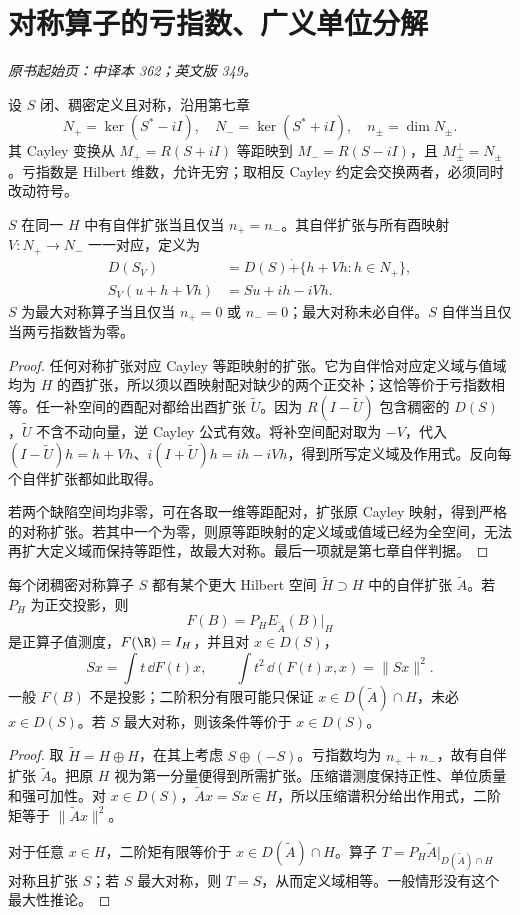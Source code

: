 \section{对称算子的亏指数、广义单位分解}\label{sec:yosida-11-15}
\noindent\textit{原书起始页：中译本 362；英文版 349。}

设 $S$ 闭、稠密定义且对称，沿用第七章
\[
 N_+=\ker(S^*-iI),\quad N_-=\ker(S^*+iI),\quad
 n_\pm=\dim N_\pm.
\]
其 Cayley 变换从 $M_+=R(S+iI)$ 等距映到 $M_-=R(S-iI)$，且 $M_\pm^\perp=N_\pm$。亏指数是 Hilbert 维数，允许无穷；取相反 Cayley 约定会交换两者，必须同时改动符号。

\begin{theorem}[自伴扩张与最大对称性]\label{thm:y11-extensions}
$S$ 在同一 $H$ 中有自伴扩张当且仅当 $n_+=n_-$。其自伴扩张与所有酉映射 $V:N_+\to N_-$ 一一对应，定义为
\begin{align*}
 D(S_V)&=D(S)\mathbin{\dot+}\{h+Vh:h\in N_+\},\\
 S_V(u+h+Vh)&=Su+ih-iVh.
\end{align*}
$S$ 为最大对称算子当且仅当 $n_+=0$ 或 $n_-=0$；最大对称未必自伴。$S$ 自伴当且仅当两亏指数皆为零。
\end{theorem}
\begin{proof}
任何对称扩张对应 Cayley 等距映射的扩张。它为自伴恰对应定义域与值域均为 $H$ 的酉扩张，所以须以酉映射配对缺少的两个正交补；这恰等价于亏指数相等。任一补空间的酉配对都给出酉扩张 $\widetilde U$。因为 $R(I-\widetilde U)$ 包含稠密的 $D(S)$，$\widetilde U$ 不含不动向量，逆 Cayley 公式有效。将补空间配对取为 $-V$，代入 $(I-\widetilde U)h=h+Vh$、$i(I+\widetilde U)h=ih-iVh$，得到所写定义域及作用式。反向每个自伴扩张都如此取得。

若两个缺陷空间均非零，可在各取一维等距配对，扩张原 Cayley 映射，得到严格的对称扩张。若其中一个为零，则原等距映射的定义域或值域已经为全空间，无法再扩大定义域而保持等距性，故最大对称。最后一项就是第七章自伴判据。
\end{proof}

\begin{theorem}[扩空间与广义谱测度]\label{thm:y11-generalized-resolution}
每个闭稠密对称算子 $S$ 都有某个更大 Hilbert 空间 $\widetilde H\supset H$ 中的自伴扩张 $\widetilde A$。若 $P_H$ 为正交投影，则
\[
 F(B)=P_HE_{\widetilde A}(B)|_H
\]
是正算子值测度，$F(\R)=I_H$，并且对 $x\in D(S)$，
\[
 Sx=\int t\,\dd F(t)x,\qquad
 \int t^2\,\dd(F(t)x,x)=\|Sx\|^2.
\]
一般 $F(B)$ 不是投影；二阶积分有限可能只保证 $x\in D(\widetilde A)\cap H$，未必 $x\in D(S)$。若 $S$ 最大对称，则该条件等价于 $x\in D(S)$。
\end{theorem}
\begin{proof}
取 $\widetilde H=H\oplus H$，在其上考虑 $S\oplus(-S)$。亏指数均为 $n_++n_-$，故有自伴扩张 $\widetilde A$。把原 $H$ 视为第一分量便得到所需扩张。压缩谱测度保持正性、单位质量和强可加性。对 $x\in D(S)$，$\widetilde Ax=Sx\in H$，所以压缩谱积分给出作用式，二阶矩等于 $\|\widetilde Ax\|^2$。

对于任意 $x\in H$，二阶矩有限等价于 $x\in D(\widetilde A)\cap H$。算子 $T=P_H\widetilde A|_{D(\widetilde A)\cap H}$ 对称且扩张 $S$；若 $S$ 最大对称，则 $T=S$，从而定义域相等。一般情形没有这个最大性推论。
\end{proof}

